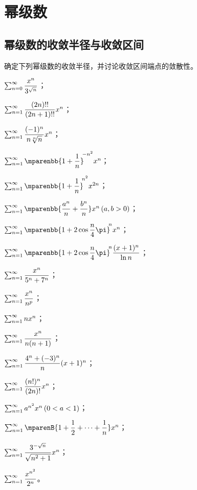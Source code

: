 

\chapter{幂级数}\label{ch:13}

\section{幂级数的收敛半径与收敛区间}
\begin{exercise}
\item 确定下列幂级数的收敛半径，并讨论收敛区间端点的敛散性。
\begin{exlistcols}
  \item $\sum_{n=0}^\infty\dfrac{x^n}{3^{\sqrt n}}$；
  \item $\sum_{n=1}^\infty\dfrac{(2n)!!}{(2n+1)!!}x^n$；
  \item $\sum_{n=1}^\infty\dfrac{(-1)^n}{n\sqrt[n]n}x^n$；
  \item $\sum_{n=1}^\sinf\mparenbb{1+\dfrac1n}^{\msp -n^2}x^n$；
  \item $\sum_{n=1}^\sinf\mparenbb{1+\dfrac1n}^{\msp n^2}x^{2n}$；
  \item $\sum_{n=1}^\sinf\mparenbb{\dfrac{a^n}n+\dfrac{b^n}n}x^n\mcond{a,b>0}$；
  \item $\sum_{n=1}^\sinf\mparenbb{1+2\cos\dfrac n4\pi}^{\msp n}x^n$；
  \item $\sum_{n=1}^\sinf\mparenbb{1+2\cos\dfrac n4\pi}^{\msp n}\dfrac{(x+1)^n}{\ln n}$；
  \item $\sum_{n=1}^\infty\dfrac{x^n}{5^n+7^n}$；
  \item $\sum_{n=1}^\infty\dfrac{x^n}{n^p}$；
  \item $\sum_{n=1}^\infty nx^n$；
  \item $\sum_{n=1}^\infty\dfrac{x^n}{n(n+1)}$；
  \item $\sum_{n=1}^\infty\dfrac{4^n+(-3)^n}n(x+1)^n$；
  \item $\sum_{n=1}^\infty\dfrac{(n!)^n}{(2n)!}x^n$；
  \item $\sum_{n=1}^\sinf a^{n^2}x^n\mcond{0<a<1}$；
  \item $\sum_{n=1}^\sinf\mparenB{1+\dfrac12+\dotsb+\dfrac1n}x^n$；
  \item $\sum_{n=1}^\infty\dfrac{3^{-\sqrt n}}{\sqrt{n^2+1}}x^n$；
  \item $\sum_{n=1}^\infty\dfrac{x^{n^2}}{2^n}$。
\end{exlistcols}

\end{exercise}

